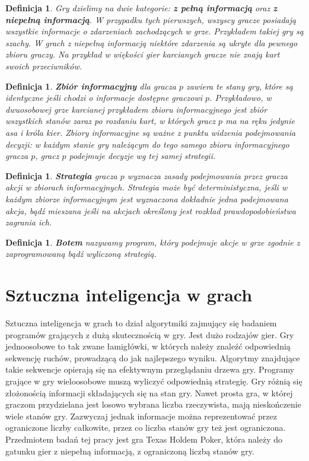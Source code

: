\documentclass[licencjacka]{pracamgr}
\newtheorem{definition}[theorem]{Definicja}
\begin{document}
\begin{definition}
      Gry dzielimy na dwie kategorie: \textbf{z pełną informacją} oraz \textbf{z niepełną informacją}.
      W przypadku tych pierwszych, wszyscy gracze posiadają wszystkie informacje o zdarzeniach
      zachodzących w grze. Przykładem takiej gry są szachy. W grach z niepełną informacją niektóre
      zdarzenia są ukryte dla pewnego zbioru graczy. Na przykład w więkości gier karcianych gracze
      nie znają kart swoich przeciwników.
\end{definition}

\begin{definition}
      \textbf{Zbiór informacyjny} dla gracza $p$ zawiera te stany gry, które są identyczne jeśli chodzi
      o informacje dostępne graczowi $p$. Przykładowo, w dwuosobowej grze karcianej przykładem zbioru informacyjnego
      jest zbiór wszystkich stanów zaraz po rozdaniu kart, w których gracz $p$ ma na ręku jedynie asa i króla kier.
      Zbiory informacyjne są ważne z punktu widzenia podejmowania decyzji: w każdym stanie gry należącym do tego
      samego zbioru informacyjnego gracza $p$, gracz $p$ podejmuje decyzje wg tej samej strategii.
\end{definition}

\begin{definition}
      \textbf{Strategia} gracza $p$ wyznacza zasady podejmowania przez gracza akcji w zbiorach informacyjnych.
      Strategia może być deterministyczna, jeśli w każdym zbiorze informacyjnym jest wyznaczona dokładnie
      jedna podejmowana akcja, bądź mieszana jeśli na akcjach określony jest rozkład prawdopodobieństwa
      zagrania ich.
\end{definition}

\begin{definition}
      \textbf{Botem} nazywamy program, który podejmuje akcje w grze zgodnie z zaprogramowaną bądź wyliczoną strategią.
\end{definition}

\section{Sztuczna inteligencja w grach}

Sztuczna inteligencja w grach to dział algorytmiki zajmujący się badaniem programów grających
z dużą skutecznością w gry. Jest dużo rodzajów gier. Gry jednoosobowe to tak zwane łamigłówki, w których
należy znaleźć odpowiednią sekwencję ruchów, prowadzącą do jak najlepszego wyniku. Algorytmy znajdujące
takie sekwencje opierają się na efektywnym przeglądaniu drzewa gry. Programy grające w gry wieloosobowe
muszą wyliczyć odpowiednią strategię. Gry różnią się złożonością informacji składających się na stan gry.
Nawet prosta gra, w której graczom przydzielana jest losowo wybrana liczba rzeczywista, mają nieskończenie
wiele stanów gry. Zazwyczaj jednak informacje można reprezentować przez ograniczone liczby całkowite, przez co
liczba stanów gry też jest ograniczona. Przedmiotem badań tej pracy jest gra Texas Holdem Poker, która
należy do gatunku gier z niepełną informacją, z ograniczoną liczbą stanów gry.
\end{document}
